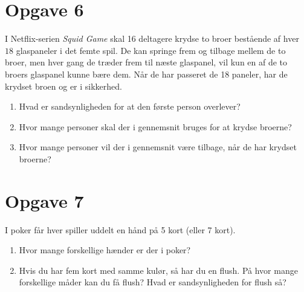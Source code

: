 \section*{Opgave 6}
I Netflix-serien \textit{Squid Game} skal 16 deltagere krydse to broer bestående af hver $18$ glaspaneler i det femte spil. De kan springe frem og tilbage mellem de to broer, men hver gang de træder frem til næste glaspanel, vil kun en af de to broers glaspanel kunne bære dem. Når de har passeret de 18 paneler, har de krydset broen og er i sikkerhed.
\begin{enumerate}[label=\roman*)]
\item Hvad er sandsynligheden for at den første person overlever?
\item Hvor mange personer skal der i gennemsnit bruges for at krydse broerne? 
\item Hvor mange personer vil der i gennemsnit være tilbage, når de har krydset broerne?
\end{enumerate}


\section*{Opgave 7}
I poker får hver spiller uddelt en hånd på 5 kort (eller 7 kort). 
\begin{enumerate}[label=\roman*)]
\item Hvor mange forskellige hænder er der i poker?
\item Hvis du har fem kort med samme kulør, så har du en flush. På hvor mange forskellige måder kan du få flush? Hvad er sandsynligheden for flush så?
\end{enumerate}
